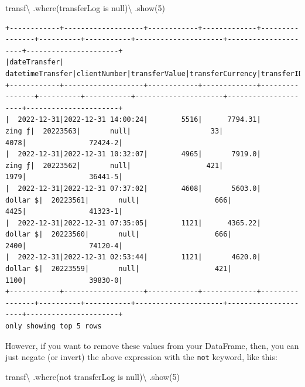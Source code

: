 \documentclass[
  11pt,
  letterpaper,
  DIV=11,
  numbers=noendperiod]{scrreprt}
\newenvironment{Shaded}{\begin{snugshade}}{\end{snugshade}}
\newcommand{\DecValTok}[1]{\textcolor[rgb]{0.68,0.00,0.00}{#1}}
\newcommand{\NormalTok}[1]{\textcolor[rgb]{0.00,0.23,0.31}{#1}}
\newcommand{\OperatorTok}[1]{\textcolor[rgb]{0.37,0.37,0.37}{#1}}
\newcommand{\StringTok}[1]{\textcolor[rgb]{0.13,0.47,0.30}{#1}}
\begin{document}
\begin{Shaded}
\begin{Highlighting}[]
\NormalTok{transf}\OperatorTok{\textbackslash{}}
\NormalTok{  .where(}\StringTok{\textquotesingle{}transferLog is null\textquotesingle{}}\NormalTok{)}\OperatorTok{\textbackslash{}}
\NormalTok{  .show(}\DecValTok{5}\NormalTok{)}
\end{Highlighting}
\end{Shaded}

\begin{verbatim}
+------------+-------------------+------------+-------------+----------------+----------+-----------+---------------------+---------------------+----------------------+
|dateTransfer|   datetimeTransfer|clientNumber|transferValue|transferCurrency|transferID|transferLog|destinationBankNumber|destinationBankBranch|destinationBankAccount|
+------------+-------------------+------------+-------------+----------------+----------+-----------+---------------------+---------------------+----------------------+
|  2022-12-31|2022-12-31 14:00:24|        5516|      7794.31|          zing ƒ|  20223563|       null|                   33|                 4078|               72424-2|
|  2022-12-31|2022-12-31 10:32:07|        4965|       7919.0|          zing ƒ|  20223562|       null|                  421|                 1979|               36441-5|
|  2022-12-31|2022-12-31 07:37:02|        4608|       5603.0|        dollar $|  20223561|       null|                  666|                 4425|               41323-1|
|  2022-12-31|2022-12-31 07:35:05|        1121|      4365.22|        dollar $|  20223560|       null|                  666|                 2400|               74120-4|
|  2022-12-31|2022-12-31 02:53:44|        1121|       4620.0|        dollar $|  20223559|       null|                  421|                 1100|               39830-0|
+------------+-------------------+------------+-------------+----------------+----------+-----------+---------------------+---------------------+----------------------+
only showing top 5 rows
\end{verbatim}

However, if you want to remove these values from your DataFrame, then,
you can just negate (or invert) the above expression with the
\texttt{not} keyword, like this:

\begin{Shaded}
\begin{Highlighting}[]
\NormalTok{transf}\OperatorTok{\textbackslash{}}
\NormalTok{  .where(}\StringTok{\textquotesingle{}not transferLog is null\textquotesingle{}}\NormalTok{)}\OperatorTok{\textbackslash{}}
\NormalTok{  .show(}\DecValTok{5}\NormalTok{)}
\end{Highlighting}
\end{Shaded}
\end{document}
